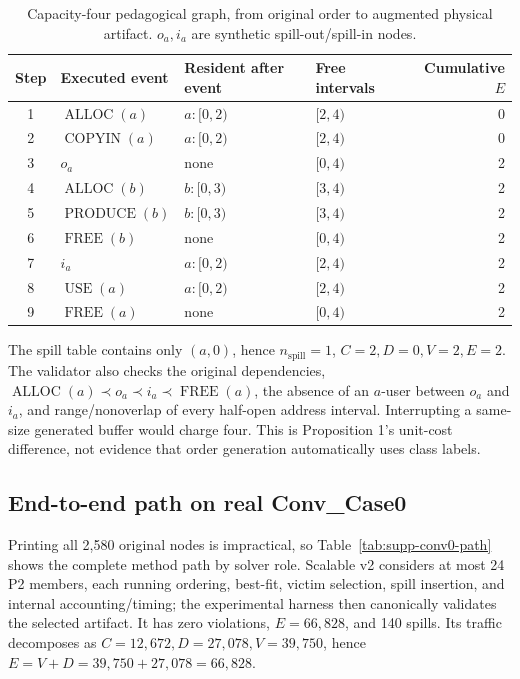 \begin{table}[H]
\centering
\caption{Capacity-four pedagogical graph, from original order to augmented physical artifact. $o_a,i_a$ are synthetic spill-out/spill-in nodes.}
\label{tab:supp-toy-trace}
\begin{tabular}{@{}clllr@{}}
\toprule
Step & Executed event & Resident after event & Free intervals & Cumulative $E$\\
\midrule
1 & $\operatorname{ALLOC}(a)$ & $a:[0,2)$ & $[2,4)$ & 0\\
2 & $\operatorname{COPYIN}(a)$ & $a:[0,2)$ & $[2,4)$ & 0\\
3 & $o_a$ & none & $[0,4)$ & 2\\
4 & $\operatorname{ALLOC}(b)$ & $b:[0,3)$ & $[3,4)$ & 2\\
5 & $\operatorname{PRODUCE}(b)$ & $b:[0,3)$ & $[3,4)$ & 2\\
6 & $\operatorname{FREE}(b)$ & none & $[0,4)$ & 2\\
7 & $i_a$ & $a:[0,2)$ & $[2,4)$ & 2\\
8 & $\operatorname{USE}(a)$ & $a:[0,2)$ & $[2,4)$ & 2\\
9 & $\operatorname{FREE}(a)$ & none & $[0,4)$ & 2\\
\bottomrule
\end{tabular}
\end{table}

The spill table contains only $(a,0)$, hence $n_{\mathrm{spill}}=1$, $C=2,D=0,V=2,E=2$. The validator also checks the original dependencies, $\operatorname{ALLOC}(a)\prec o_a\prec i_a\prec\operatorname{FREE}(a)$, the absence of an $a$-user between $o_a$ and $i_a$, and range/nonoverlap of every half-open address interval. Interrupting a same-size generated buffer would charge four. This is Proposition 1's unit-cost difference, not evidence that order generation automatically uses class labels.

\subsection{End-to-end path on real Conv\_Case0}

Printing all 2,580 original nodes is impractical, so Table~\ref{tab:supp-conv0-path} shows the complete method path by solver role. Scalable v2 considers at most 24 P2 members, each running ordering, best-fit, victim selection, spill insertion, and internal accounting/timing; the experimental harness then canonically validates the selected artifact. It has zero violations, $E=66{,}828$, and 140 spills. Its traffic decomposes as $C=12{,}672,D=27{,}078,V=39{,}750$, hence $E=V+D=39{,}750+27{,}078=66{,}828$.

